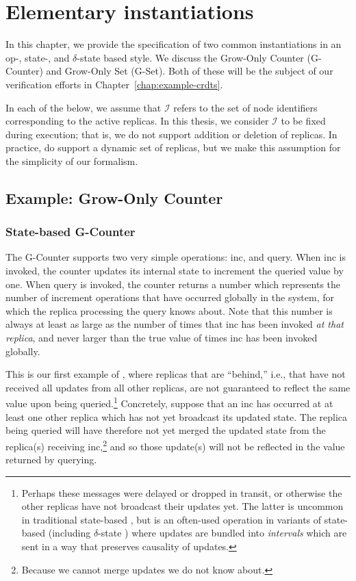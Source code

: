\chapter{Elementary \CRDT instantiations}
\label{chap:crdt-instantiations}

In this chapter, we provide the specification of two common \CRDT instantiations
in an op-, state-, and $\delta$-state based style. We discuss the Grow-Only
Counter (G-Counter) and Grow-Only Set (G-Set). Both of these will be the subject
of our verification efforts in Chapter~\ref{chap:example-crdts}.

In each of the below, we assume that $\mathcal{I}$ refers to the set of node
identifiers corresponding to the active replicas. In this thesis, we
consider $\mathcal{I}$ to be fixed during execution; that is, we do not support
addition or deletion of replicas. In practice, \CRDTs do support a dynamic set
of replicas, but we make this assumption for the simplicity of our formalism.

\section{Example: Grow-Only Counter}
\label{sec:example-gcounter}

\subsection{State-based G-Counter}
The G-Counter supports two very simple operations: \textsf{inc}, and query. When
\textsf{inc} is invoked, the counter updates its internal state to increment the
queried value by one. When query is invoked, the counter returns a number which
represents the number of increment operations that have occurred globally in the
system, for which the replica processing the query knows about. Note that this
number is always at least as large as the number of times that \textsf{inc} has
been invoked \textit{at that replica}, and never larger than the true value of
times \textsf{inc} has been invoked globally.

This is our first example of \SEC, where replicas that are ``behind,'' i.e.,
that have not received all updates from all other replicas, are not guaranteed
to reflect the same value upon being queried.\footnote{Perhaps these messages
were delayed or dropped in transit, or otherwise the other replicas have not
broadcast their updates yet. The latter is uncommon in traditional state-based
\CRDTs, but is an often-used operation in variants of state-based \CRDTs
(including $\delta$-state \CRDTs) where updates are bundled into
\emph{intervals} which are sent in a way that preserves causality of updates.}
Concretely, suppose that an \textsf{inc} has occurred at at least one other
replica which has not yet broadcast its updated state. The replica being queried
will have therefore not yet merged the updated state from the replica(s)
receiving \textsf{inc},\footnote{Because we cannot merge updates we do not know
about.} and so those update(s) will not be reflected in the value returned by
querying.

